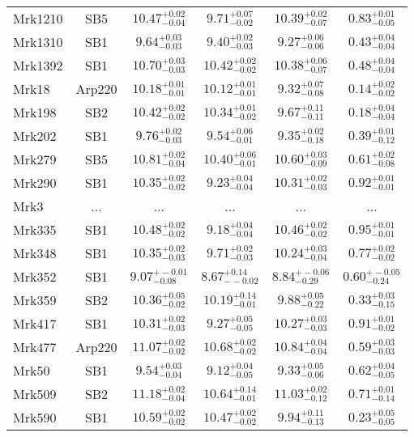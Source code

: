 \documentclass[onecolumn]{mn2e}
\begin{document}
{\begin{center}
\begin{longtable}{lccccc}
Mrk1210 & SB5 & $10.47_{-0.04}^{+0.02}$ & $9.71_{-0.02}^{+0.07}$ & $10.39_{-0.07}^{+0.02}$ &$0.83_{-0.05}^{+0.01}$ \\
Mrk1310 & SB1 & $9.64_{-0.03}^{+0.03}$ & $9.40_{-0.03}^{+0.02}$ & $9.27_{-0.06}^{+0.06}$ &$0.43_{-0.04}^{+0.04}$ \\
Mrk1392 & SB1 & $10.70_{-0.03}^{+0.03}$ & $10.42_{-0.02}^{+0.02}$ & $10.38_{-0.07}^{+0.06}$ &$0.48_{-0.04}^{+0.04}$ \\
Mrk18 & Arp220 & $10.18_{-0.01}^{+0.01}$ & $10.12_{-0.01}^{+0.01}$ & $9.32_{-0.08}^{+0.07}$ &$0.14_{-0.02}^{+0.02}$ \\
Mrk198 & SB2 & $10.42_{-0.02}^{+0.02}$ & $10.34_{-0.02}^{+0.01}$ & $9.67_{-0.11}^{+0.11}$ &$0.18_{-0.04}^{+0.04}$ \\
Mrk202 & SB1 & $9.76_{-0.03}^{+0.02}$ & $9.54_{-0.01}^{+0.06}$ & $9.35_{-0.18}^{+0.02}$ &$0.39_{-0.12}^{+0.01}$ \\
Mrk279 & SB5 & $10.81_{-0.04}^{+0.02}$ & $10.40_{-0.01}^{+0.06}$ & $10.60_{-0.09}^{+0.03}$ &$0.61_{-0.08}^{+0.02}$ \\
Mrk290 & SB1 & $10.35_{-0.02}^{+0.02}$ & $9.23_{-0.04}^{+0.04}$ & $10.31_{-0.03}^{+0.02}$ &$0.92_{-0.01}^{+0.01}$ \\
Mrk3 & ... & ... & ... & ... &... \\
Mrk335 & SB1 & $10.48_{-0.02}^{+0.02}$ & $9.18_{-0.04}^{+0.04}$ & $10.46_{-0.02}^{+0.02}$ &$0.95_{-0.01}^{+0.01}$ \\
Mrk348 & SB1 & $10.35_{-0.03}^{+0.02}$ & $9.71_{-0.03}^{+0.02}$ & $10.24_{-0.04}^{+0.03}$ &$0.77_{-0.02}^{+0.02}$ \\
Mrk352 & SB1 & $9.07_{-0.08}^{+-0.01}$ & $8.67_{--0.02}^{+0.14}$ & $8.84_{-0.29}^{+-0.06}$ &$0.60_{-0.24}^{+-0.05}$ \\
Mrk359 & SB2 & $10.36_{-0.02}^{+0.05}$ & $10.19_{-0.01}^{+0.14}$ & $9.88_{-0.22}^{+0.05}$ &$0.33_{-0.15}^{+0.03}$ \\
Mrk417 & SB1 & $10.31_{-0.03}^{+0.02}$ & $9.27_{-0.05}^{+0.05}$ & $10.27_{-0.03}^{+0.03}$ &$0.91_{-0.02}^{+0.01}$ \\
Mrk477 & Arp220 & $11.07_{-0.02}^{+0.02}$ & $10.68_{-0.02}^{+0.02}$ & $10.84_{-0.04}^{+0.04}$ &$0.59_{-0.03}^{+0.03}$ \\
Mrk50 & SB1 & $9.54_{-0.04}^{+0.03}$ & $9.12_{-0.05}^{+0.04}$ & $9.33_{-0.06}^{+0.05}$ &$0.62_{-0.05}^{+0.04}$ \\
Mrk509 & SB2 & $11.18_{-0.04}^{+0.02}$ & $10.64_{-0.01}^{+0.14}$ & $11.03_{-0.12}^{+0.02}$ &$0.71_{-0.14}^{+0.01}$ \\
Mrk590 & SB1 & $10.59_{-0.02}^{+0.02}$ & $10.47_{-0.02}^{+0.02}$ & $9.94_{-0.13}^{+0.11}$ &$0.23_{-0.05}^{+0.05}$ \\

\end{longtable}
\end{center}}
\end{document}
